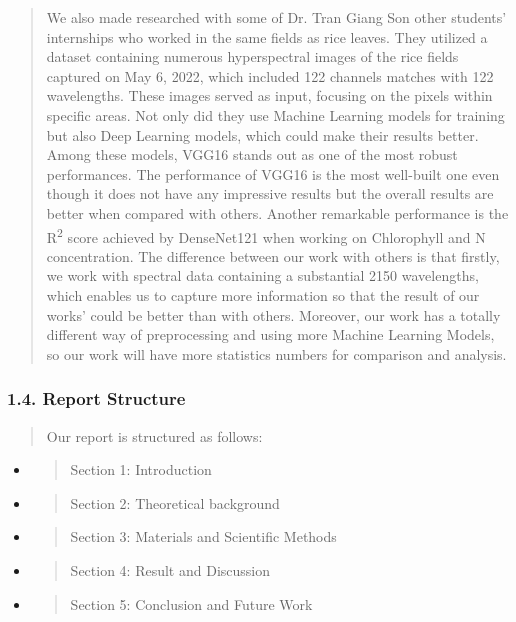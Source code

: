 \documentclass[
]{article}
\begin{document}
\begin{quote}
We also made researched with some of Dr. Tran Giang Son other students'
internships who worked in the same fields as rice leaves. They utilized
a dataset containing numerous hyperspectral images of the rice fields
captured on May 6, 2022, which included 122 channels matches with 122
wavelengths. These images served as input, focusing on the pixels within
specific areas. Not only did they use Machine Learning models for
training but also Deep Learning models, which could make their results
better. Among these models, VGG16 stands out as one of the most robust
performances. The performance of VGG16 is the most well-built one even
though it does not have any impressive results but the overall results
are better when compared with others. Another remarkable performance is
the R\textsuperscript{2} score achieved by DenseNet121 when working on
Chlorophyll and N concentration. The difference between our work with
others is that firstly, we work with spectral data containing a
substantial 2150 wavelengths, which enables us to capture more
information so that the result of our works' could be better than with
others. Moreover, our work has a totally different way of preprocessing
and using more Machine Learning Models, so our work will have more
statistics numbers for comparison and analysis.
\end{quote}

\hypertarget{report-structure}{%
\subsubsection{\texorpdfstring{ \textbf{1.4. Report
Structure}}{ 1.4. Report Structure}}\label{report-structure}}

\begin{quote}
Our report is structured as follows:
\end{quote}

\begin{itemize}
\item
  \begin{quote}
  Section 1: Introduction
  \end{quote}
\end{itemize}

\begin{itemize}
\item
  \begin{quote}
  Section 2: Theoretical background
  \end{quote}
\item
  \begin{quote}
  Section 3: Materials and Scientific Methods
  \end{quote}
\item
  \begin{quote}
  Section 4: Result and Discussion
  \end{quote}
\item
  \begin{quote}
  Section 5: Conclusion and Future Work
  \end{quote}
\end{itemize}
\end{document}
